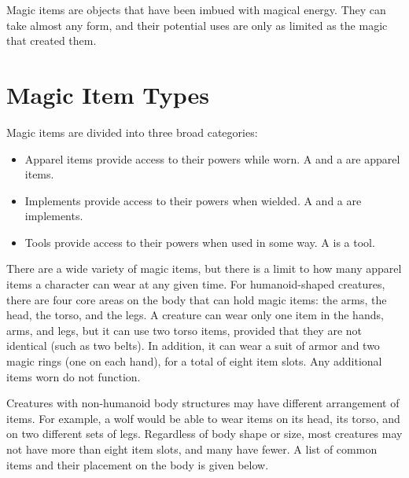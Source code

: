 Magic items are objects that have been imbued with magical energy. They can take almost any form, and their potential uses are only as limited as the magic that created them.

\section{Magic Item Types}
Magic items are divided into three broad categories:
\begin{itemize}
    \item Apparel items provide access to their powers while worn.
        A  and a  are apparel items.
    \item Implements provide access to their powers when wielded.
        A  and a  are implements.
    \item Tools provide access to their powers when used in some way.
        A  is a tool.
\end{itemize}

 There are a wide variety of magic items, but there is a limit to how many apparel items a character can wear at any given time.
For humanoid-shaped creatures, there are four core areas on the body that can hold magic items: the arms, the head, the torso, and the legs.
A creature can wear only one item in the hands, arms, and legs, but it can use two torso items, provided that they are not identical (such as two belts).
In addition, it can wear a suit of armor and two magic rings (one on each hand), for a total of eight item slots.
Any additional items worn do not function.

Creatures with non-humanoid body structures may have different arrangement of items.
For example, a wolf would be able to wear items on its head, its torso, and on two different sets of legs.
Regardless of body shape or size, most creatures may not have more than eight item slots, and many have fewer.
A list of common items and their placement on the body is given below.


